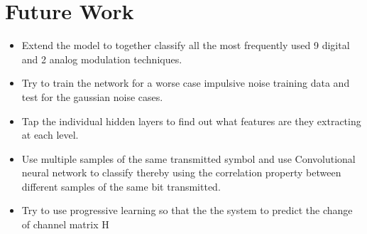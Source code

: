 \section{Future Work}

\begin{itemize}
    \item Extend the model to together classify all the most frequently used 9 digital and 2 analog modulation techniques.
    \item Try to train the network for a worse case impulsive noise training data and test for the gaussian noise cases.
    \item Tap the individual hidden layers to find out what features are they extracting at each level. 
    \item Use multiple samples of the same transmitted symbol and use Convolutional neural network to classify thereby using the correlation property between different samples of the same bit transmitted.
    \item Try to use progressive learning so that the the system to predict the change of channel matrix H 
\end{itemize}